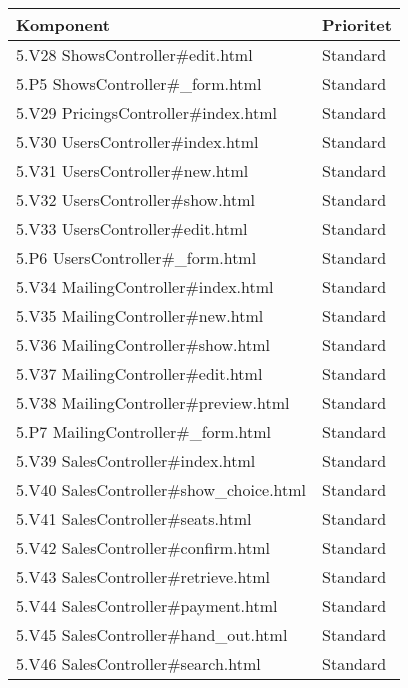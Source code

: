 \documentclass[a4paper, twoside, 11pt, titlepage]{article}
\begin{document}
		\begin {table} [ht] \begin{tabular} {  p{10cm} p{5.1cm} }
			\hline
			{\sffamily\textbf{Komponent}} & {\sffamily\textbf{Prioritet}} \\
			\hline
			{ 5.V28 ShowsController\#edit.html } & { Standard } \\
			\hline
			{ 5.P5 ShowsController\#\_form.html } & { Standard } \\
			\hline
			{ 5.V29 PricingsController\#index.html } & { Standard } \\
			\hline
			{ 5.V30 UsersController\#index.html } & { Standard } \\
			\hline
			{ 5.V31 UsersController\#new.html } & { Standard } \\
			\hline
			{ 5.V32 UsersController\#show.html } & { Standard } \\
			\hline
			{ 5.V33 UsersController\#edit.html } & { Standard } \\
			\hline
			{ 5.P6 UsersController\#\_form.html } & { Standard } \\
			\hline
			{ 5.V34 MailingController\#index.html } & { Standard } \\
			\hline
			{ 5.V35 MailingController\#new.html } & { Standard } \\
			\hline
			{ 5.V36 MailingController\#show.html } & { Standard } \\
			\hline
			{ 5.V37 MailingController\#edit.html } & { Standard } \\
			\hline
			{ 5.V38 MailingController\#preview.html } & { Standard } \\
			\hline
			{ 5.P7 MailingController\#\_form.html } & { Standard } \\
			\hline
			{ 5.V39 SalesController\#index.html } & { Standard } \\
			\hline
			{ 5.V40 SalesController\#show\_choice.html } & { Standard } \\
			\hline
			{ 5.V41 SalesController\#seats.html } & { Standard } \\
			\hline
			{ 5.V42 SalesController\#confirm.html } & { Standard } \\
			\hline
			{ 5.V43 SalesController\#retrieve.html } & { Standard } \\
			\hline
			{ 5.V44 SalesController\#payment.html } & { Standard } \\
			\hline
			{ 5.V45 SalesController\#hand\_out.html } & { Standard } \\
			\hline
			{ 5.V46 SalesController\#search.html } & { Standard } \\

\end{tabular}
\end{table}
\end{document}
